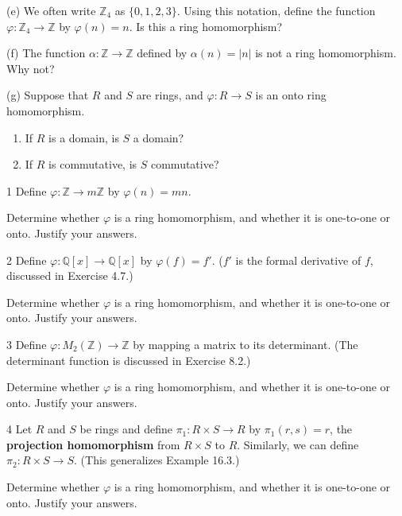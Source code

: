 \begin{problem}[Warmup]{(e)}
    We often write $\mathbb{Z}_4$ as $\{0, 1, 2, 3\}$. Using this notation, define the function $\varphi : \mathbb{Z}_4 \to \mathbb{Z}$ by $\varphi(n) = n$. Is this a ring homomorphism?
\end{problem}
\unsolved

\begin{problem}[Warmup]{(f)}
    The function $\alpha : \mathbb{Z} \to \mathbb{Z}$ defined by $\alpha(n) = |n|$ is not a ring homomorphism. Why not?
\end{problem}
\unsolved

\begin{problem}[Warmup]{(g)}
    Suppose that $R$ and $S$ are rings, and $\varphi : R \to S$ is an onto ring homomorphism.
    \begin{enumerate}
        \item[(a)] If $R$ is a domain, is $S$ a domain?
        \item[(b)] If $R$ is commutative, is $S$ commutative?
    \end{enumerate}
\end{problem}
\unsolved

\begin{problem}{1}
    Define $\varphi : \mathbb{Z} \to m\mathbb{Z}$ by $\varphi(n) = mn$.

    Determine whether $\varphi$ is a ring homomorphism, and whether it is
    one-to-one or onto. Justify your answers.
\end{problem}
\unsolved

\begin{problem}{2}
    Define $\varphi : \mathbb{Q}[x] \to \mathbb{Q}[x]$ by $\varphi(f) = f'$. ($f'$ is the formal derivative of $f$, discussed in Exercise 4.7.)

    Determine whether $\varphi$ is a ring homomorphism, and whether it is
    one-to-one or onto. Justify your answers.
\end{problem}
\unsolved

\begin{problem}{3}
    Define $\varphi : M_2(\mathbb{Z}) \to \mathbb{Z}$ by mapping a matrix to its determinant. (The determinant function is discussed in Exercise 8.2.)

    Determine whether $\varphi$ is a ring homomorphism, and whether it is
    one-to-one or onto. Justify your answers.
\end{problem}
\unsolved

\begin{problem}{4}
    Let $R$ and $S$ be rings and define $\pi_1 : R \times S \to R$ by $\pi_1(r, s) = r$, the \textbf{projection homomorphism} from $R \times S$ to $R$. Similarly, we can define $\pi_2 : R \times S \to S$. (This generalizes Example 16.3.)

    Determine whether $\varphi$ is a ring homomorphism, and whether it is
    one-to-one or onto. Justify your answers.
\end{problem}
\unsolved

